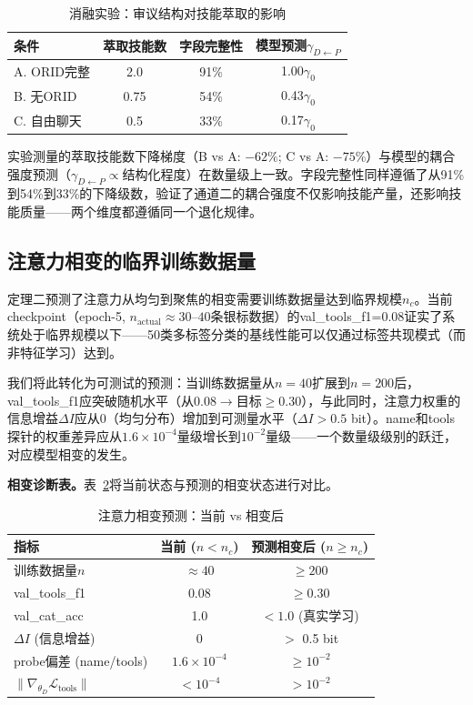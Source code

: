 \documentclass[twocolumn,10.5pt]{ctexart}
\def\cL{\mathcal{L}}
\begin{document}
\begin{table}[t]
\centering
\caption{消融实验：审议结构对技能萃取的影响}
\label{tab:ablation}
\setlength{\tabcolsep}{2pt}
\renewcommand{\arraystretch}{1.15}
\begin{tabular}{lccc}
\toprule
条件 & 萃取技能数 & 字段完整性 & 模型预测$\gamma_{D\leftarrow P}$ \\
\midrule
A. ORID完整 & 2.0 & 91\% & 1.00$\gamma_0$ \\
B. 无ORID & 0.75 & 54\% & 0.43$\gamma_0$ \\
C. 自由聊天 & 0.5 & 33\% & 0.17$\gamma_0$ \\
\bottomrule
\end{tabular}
\end{table}

实验测量的萃取技能数下降梯度（B vs A: $-62\%$; C vs A: $-75\%$）与模型的耦合强度预测（$\gamma_{D\leftarrow P} \propto \text{结构化程度}$）在数量级上一致。字段完整性同样遵循了从91\%到54\%到33\%的下降级数，验证了通道二的耦合强度不仅影响技能产量，还影响技能质量——两个维度都遵循同一个退化规律。

\subsection{注意力相变的临界训练数据量}

定理二预测了注意力从均匀到聚焦的相变需要训练数据量达到临界规模$n_c$。当前checkpoint（epoch-5, $n_{\text{actual}} \approx 30\text{--}40$条银标数据）的val\_tools\_f1=0.08证实了系统处于临界规模以下——50类多标签分类的基线性能可以仅通过标签共现模式（而非特征学习）达到。

我们将此转化为可测试的预测：当训练数据量从$n=40$扩展到$n=200$后，val\_tools\_f1应突破随机水平（从$0.08 \to \text{目标} \geq 0.30$），与此同时，注意力权重的信息增益$\Delta I$应从$0$（均匀分布）增加到可测量水平（$\Delta I > 0.5$ bit）。name和tools探针的权重差异应从$1.6\times10^{-4}$量级增长到$10^{-2}$量级——一个数量级级别的跃迁，对应模型相变的发生。

\textbf{相变诊断表。}表~\ref{tab:phase_transition}将当前状态与预测的相变状态进行对比。

\begin{table}[t]
\centering
\caption{注意力相变预测：当前 vs 相变后}
\label{tab:phase_transition}
\setlength{\tabcolsep}{2pt}
\renewcommand{\arraystretch}{1.15}
\begin{tabular}{lcc}
\toprule
指标 & 当前 ($n< n_c$) & 预测相变后 ($n \geq n_c$) \\
\midrule
训练数据量$n$ & $\approx 40$ & $\geq 200$ \\
val\_tools\_f1 & 0.08 & $\geq 0.30$ \\
val\_cat\_acc & 1.0 & $<1.0$ (真实学习) \\
$\Delta I$ (信息增益) & 0 & $>$ 0.5 bit \\
probe偏差 (name/tools) & $1.6\times 10^{-4}$ & $\geq 10^{-2}$ \\
$\|\nabla_{\theta_D}\cL_{\text{tools}}\|$ & $<10^{-4}$ & $> 10^{-2}$ \\
\bottomrule
\end{tabular}
\end{table}
\end{document}
